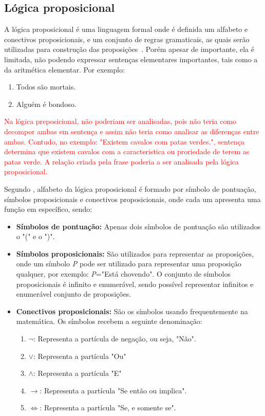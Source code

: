\subsection{Lógica proposicional}

A lógica proposicional é uma linguagem formal onde é definida um alfabeto e conectivos proposicionais, e um conjunto de regras gramaticais, as quais serão utilizadas para construção das proposições~\cite{souza2017logica}. Porém apesar de importante, ela é limitada, não podendo expressar sentenças elementares importantes, tais como a da aritmética elementar. Por exemplo:
\begin{enumerate}
\item Todos são mortais.
\item Alguém é bondoso.
\end{enumerate}

\textcolor{red}{Na lógica preposicional, não poderiam ser analisadas, pois não teria como decompor ambas em sentença e assim não teria como analisar as diferenças entre ambas. Contudo, no exemplo: "Existem cavalos com patas verdes.", sentença determina que existem cavalos com a caracteristica ou proriedade de terem as patas verde. A relação criada pela frase poderia a ser analisada pela lógica proposicional\cite{abe2002introducao}.}


Segundo \citeauthor{souza2017logica}, alfabeto da lógica proposicional é formado por símbolo de pontuação, símbolos proposicionais e conectivos proposicionais, onde cada um apresenta uma função em específico, sendo:
\begin{itemize}
  \item \textbf{Símbolos de pontuação: }Apenas dois símbolos de pontuação são utilizados o "(" e o ")".
  \item \textbf{Símbolos proposicionais:} São utilizados para representar as proposições, onde um símbolo \textit{P} pode ser utilizado para representar uma proposição qualquer, por exemplo: \textit{P}="Está chovendo". O conjunto de símbolos proposicionais é infinito e enumerável, sendo possível representar infinitos e enumerável conjunto de proposições.
  \item \textbf{Conectivos proposicionais:} São os símbolos usando frequentemente na matemática. Os símbolos recebem a seguinte denominação: 
\begin{enumerate}
\item \textbf{$\neg$}: Representa a partícula de negação, ou seja, "Não".
\item \textbf{$\lor$}: Representa a partícula "Ou"
\item \textbf{$\land$}: Representa a partícula "E"
\item \textbf{$\rightarrow$}: Representa a partícula "Se então ou implica".
\item \textbf{$\Leftrightarrow$}: Representa a partícula "Se, e somente se".
\end{enumerate} 
\end{itemize}

